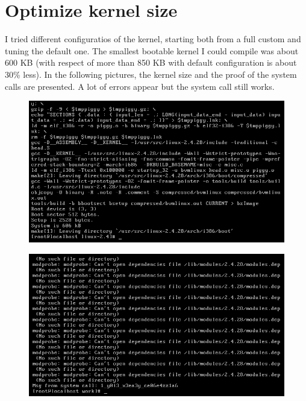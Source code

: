\documentclass{article}
\begin{document}
\section{Optimize kernel size}
I tried different configuratios of the kernel, starting both from a full custom and tuning the default one. The smallest bootable kernel I could compile was about 600 KB (with respect of more than 850 KB with default configuration is about 30\% less). In the following pictures, the kernel size and the proof of the system calls are presented. A lot of errors appear but the system call still works.  

\begin{figure}
  \centering
  \includegraphics[width=\textwidth]{./small2.png}
\end{figure}

\begin{figure}
  \centering
  \includegraphics[width=\textwidth]{./small_example.png}
\end{figure}
\end{document}
